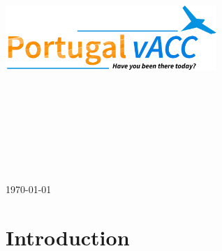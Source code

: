 \documentclass[a4paper,oneside,11pt]{memoir}
\begin{document}
\thispagestyle{empty}

{%

\centering
\Large

~\vspace{\fill}

{\huge
  \textbf{
    \includegraphics[max height=10cm,max width=8cm]{styles/logo.png}\\
    \vspace{1.5cm}
    \MakeUppercase{\docsubject}
}
}

\vspace{2.5cm}

{\LARGE
\MakeUppercase{\doctitle}
}

\vspace{3.5cm}

\coverdesc

\medskip

\vspace{\fill}

\today

}%


\chapter{Introduction}
\end{document}
